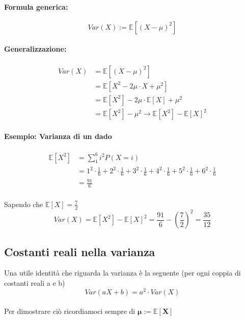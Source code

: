 \documentclass[]{article}
\newcommand{\ev}{\mathbb{E}[X]}
\renewcommand{\ev}[1]{\mathbb{E}[#1]}
\newcommand{\formula}{\paragraph{Formula generica:}}
\begin{document}
    \formula \[ Var(X) := \ev{(X - \mu)^2} \]

    \paragraph{Generalizzazione:}
    \begin{equation*}
        \begin{split}
            Var(X) & = \ev{(X - \mu)^2} \\
            & = \ev{X^2 - 2 \mu \cdot X + \mu^2} \\
            & = \ev{X^2} - 2 \mu \cdot \ev{X} + \mu^2 \\
            & = \ev{X^2} - \mu^2 \longrightarrow \ev{X^2} - \ev{X}^2
        \end{split}
    \end{equation*}
    
    \paragraph{Esempio: Varianza di un dado}
    \begin{equation*}
        \begin{split}
            \ev{X^2} & = \sum_{1}^{6} i^2 P(X = i) \\
            & = 1^2 \cdot \frac{1}{6} + 2^2 \cdot \frac{1}{6} + 3^2 \cdot \frac{1}{6} + 4^2 \cdot \frac{1}{6} + 5^2 \cdot \frac{1}{6} + 6^2 \cdot \frac{1}{6} \\
            & = \frac{91}{6}
        \end{split}
    \end{equation*} \\

    Sapendo che $\ev{X} = \frac{7}{2}$
    \[ Var(X) = \ev{X^2} - \ev{X}^2 = \frac{91}{6} - (\frac{7}{2})^2 = \frac{35}{12} \]

    \subsection{Costanti reali nella varianza}
    Una utile identità che riguarda la varianza è la seguente (per ogni coppia di costanti reali a e b)
    \[ Var(aX + b) = a^2 \cdot Var(X) \] \\

    Per dimostrare ciò ricordiamoci sempre di $\boldsymbol{\mu := \ev{X}}$
\end{document}
